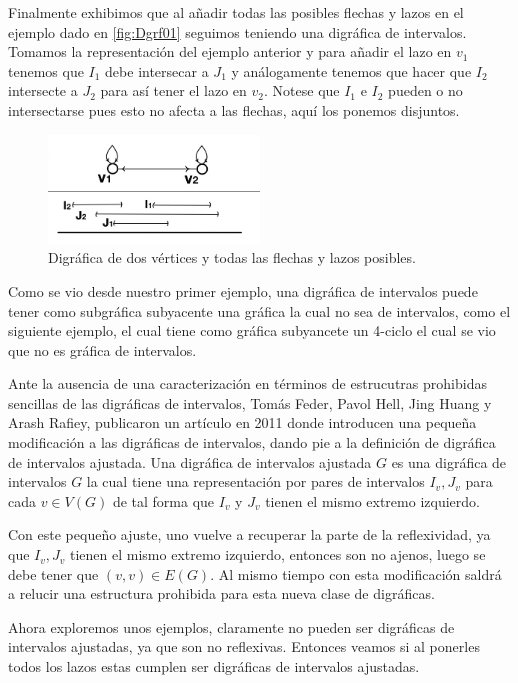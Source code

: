 Finalmente exhibimos que al añadir todas las posibles flechas y lazos en el ejemplo dado en \cref{fig:Dgrf01} seguimos teniendo una digráfica de intervalos. Tomamos la representación del ejemplo anterior y para añadir el lazo en $v_1$ tenemos que $I_1$ debe intersecar a $J_1$ y análogamente tenemos que hacer que $I_2$ intersecte a $J_2$ para así tener el lazo en $v_2$. Notese que $I_1$ e $I_2$ pueden o no intersectarse pues esto no afecta a las flechas, aquí los ponemos disjuntos.

\begin{figure}[H]
  \centering
  \includegraphics[width=0.5\textwidth]{recursos/capturas/Digraf4.jpg}
  \caption{Digráfica de dos vértices y todas las flechas y lazos posibles.}
  \label{fig:Dgrf04}
\end{figure}
 
Como se vio desde nuestro primer ejemplo, una digráfica de intervalos puede tener como subgráfica subyacente una gráfica la cual no sea de intervalos, como el siguiente ejemplo, el cual tiene como gráfica subyancete un 4-ciclo el cual se vio que no es gráfica de intervalos. 

Ante la ausencia de una caracterización en términos de estrucutras prohibidas sencillas de las digráficas de intervalos, Tomás Feder, Pavol Hell, Jing Huang y Arash Rafiey, publicaron un artículo en 2011 donde introducen una pequeña modificación a las digráficas de intervalos, dando pie a la definición de digráfica de intervalos ajustada. Una digráfica de intervalos ajustada $G$ es una digráfica de intervalos $G$ la cual tiene una representación por pares de intervalos $I_v, J_v$ para cada $v\in V(G)$ de tal forma que $I_v$ y $J_v$ tienen el mismo extremo izquierdo. 

Con este pequeño ajuste, uno vuelve a recuperar la parte de la reflexividad, ya que $I_v,J_v$ tienen el mismo extremo izquierdo, entonces son no ajenos, luego se debe tener que $(v,v)\in E(G)$. Al mismo tiempo con esta modificación saldrá a relucir una estructura prohibida para esta nueva clase de digráficas.

Ahora exploremos unos ejemplos, claramente  no pueden ser digráficas de intervalos ajustadas, ya que son no reflexivas. Entonces veamos si al ponerles todos los lazos estas cumplen ser digráficas de intervalos ajustadas.

